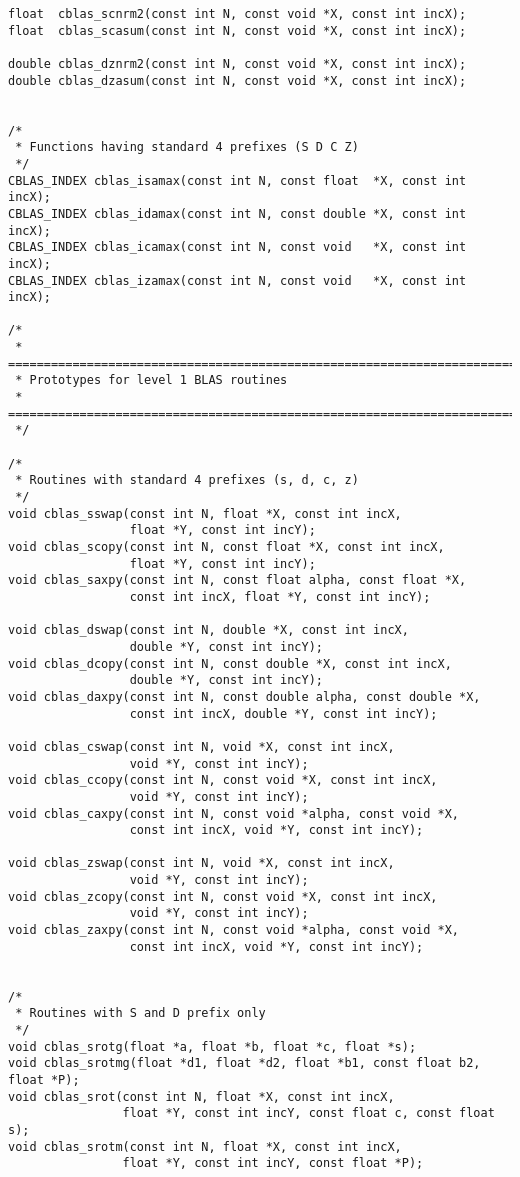 \documentclass{article}
\begin{document}
\begin{Verbatim}[fontsize=\small,fontfamily=tt,fontshape=rm]
float  cblas_scnrm2(const int N, const void *X, const int incX);
float  cblas_scasum(const int N, const void *X, const int incX);

double cblas_dznrm2(const int N, const void *X, const int incX);
double cblas_dzasum(const int N, const void *X, const int incX);


/*
 * Functions having standard 4 prefixes (S D C Z)
 */
CBLAS_INDEX cblas_isamax(const int N, const float  *X, const int incX);
CBLAS_INDEX cblas_idamax(const int N, const double *X, const int incX);
CBLAS_INDEX cblas_icamax(const int N, const void   *X, const int incX);
CBLAS_INDEX cblas_izamax(const int N, const void   *X, const int incX);

/*
 * ===========================================================================
 * Prototypes for level 1 BLAS routines
 * ===========================================================================
 */

/* 
 * Routines with standard 4 prefixes (s, d, c, z)
 */
void cblas_sswap(const int N, float *X, const int incX, 
                 float *Y, const int incY);
void cblas_scopy(const int N, const float *X, const int incX, 
                 float *Y, const int incY);
void cblas_saxpy(const int N, const float alpha, const float *X,
                 const int incX, float *Y, const int incY);

void cblas_dswap(const int N, double *X, const int incX, 
                 double *Y, const int incY);
void cblas_dcopy(const int N, const double *X, const int incX, 
                 double *Y, const int incY);
void cblas_daxpy(const int N, const double alpha, const double *X,
                 const int incX, double *Y, const int incY);

void cblas_cswap(const int N, void *X, const int incX, 
                 void *Y, const int incY);
void cblas_ccopy(const int N, const void *X, const int incX, 
                 void *Y, const int incY);
void cblas_caxpy(const int N, const void *alpha, const void *X,
                 const int incX, void *Y, const int incY);

void cblas_zswap(const int N, void *X, const int incX, 
                 void *Y, const int incY);
void cblas_zcopy(const int N, const void *X, const int incX, 
                 void *Y, const int incY);
void cblas_zaxpy(const int N, const void *alpha, const void *X,
                 const int incX, void *Y, const int incY);


/* 
 * Routines with S and D prefix only
 */
void cblas_srotg(float *a, float *b, float *c, float *s);
void cblas_srotmg(float *d1, float *d2, float *b1, const float b2, float *P);
void cblas_srot(const int N, float *X, const int incX,
                float *Y, const int incY, const float c, const float s);
void cblas_srotm(const int N, float *X, const int incX,
                float *Y, const int incY, const float *P);


\end{Verbatim}
\end{document}
